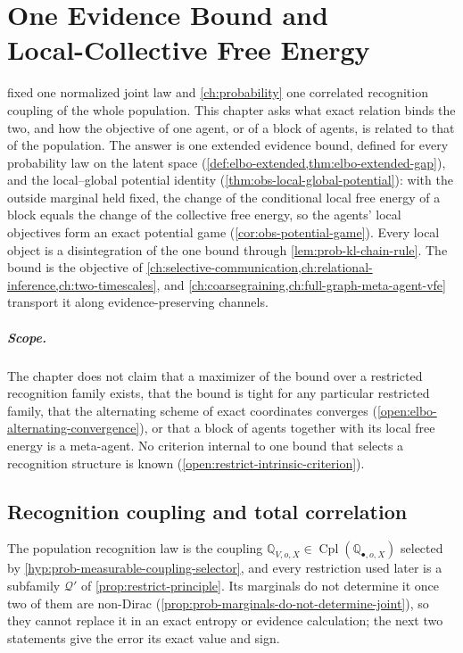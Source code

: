 \chapter[One Evidence Bound and Local-Collective Free Energy]{One Evidence Bound and\\Local-Collective Free Energy}
\label{ch:elbo}
\label{ch:local-collective-elbo}

 fixed one normalized joint law and \cref{ch:probability}
one correlated recognition coupling of the whole population. This chapter asks
what exact relation binds the two, and how the objective of one agent, or of a
block of agents, is related to that of the population. The answer is one
extended evidence bound, defined for every probability law on the latent space
(\cref{def:elbo-extended,thm:elbo-extended-gap}), and the local--global
potential identity (\cref{thm:obs-local-global-potential}): with the outside
marginal held fixed, the change of the conditional local free energy of a block
equals the change of the collective free energy, so the agents' local
objectives form an exact potential game (\cref{cor:obs-potential-game}). Every
local object is a disintegration of the one bound through
\cref{lem:prob-kl-chain-rule}. The bound is the objective of
\cref{ch:selective-communication,ch:relational-inference,ch:two-timescales},
and \cref{ch:coarsegraining,ch:full-graph-meta-agent-vfe} transport it along
evidence-preserving channels.

\paragraph{Scope.}
The chapter does not claim that a maximizer of the bound over a restricted
recognition family exists, that the bound is tight for any particular
restricted family, that the alternating scheme of exact coordinates converges
(\cref{open:elbo-alternating-convergence}), or that a block of agents together
with its local free energy is a meta-agent. No criterion internal to one bound
that selects a recognition structure is known
(\cref{open:restrict-intrinsic-criterion}). 

\section{Recognition coupling and total correlation}
\label{sec:elbo-recognition}

The population recognition law is the coupling
$\mathbb Q_{V,o,X}\in\operatorname{Cpl}(\mathbb Q_{\bullet,o,X})$ selected by
\cref{hyp:prob-measurable-coupling-selector}, and every restriction used later
is a subfamily $\mathcal Q'$ of \cref{prop:restrict-principle}. Its marginals
do not determine it once two of them are non-Dirac
(\cref{prop:prob-marginals-do-not-determine-joint}), so they cannot replace it
in an exact entropy or evidence calculation; the next two statements give the
error its exact value and sign.

